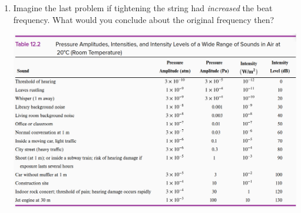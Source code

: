 \begin{enumerate}
	\item
	Imagine the last problem if tightening the string had \emph{increased} the beat frequency. What would you conclude about the original frequency then?
	
	\newpage
	\centering
	\includegraphics[width=\linewidth]{week14-table-sound-level}
	
	
\end{enumerate}